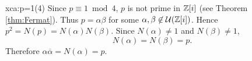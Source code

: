 %	
%	
%	

\begin{sol}{xca:p=1(4)}
    Since $p\equiv1\bmod4$, 
    $p$ is not prime in $\mathbb{Z}[i]$ (see Theorem \ref{thm:Fermat}). 
    Thus $p=\alpha\beta$ for some $\alpha,\beta\not\in\mathcal{U}(\mathbb{Z}[i])$. Hence $p^2=N(p)=N(\alpha)N(\beta)$. Since 
    $N(\alpha)\ne 1$ and $N(\beta)\ne 1$, 
    \[ 
    N(\alpha)=N(\beta)=p.
    \]
    Therefore $\alpha\overline{\alpha}=N(\alpha)=p$. 
\end{sol}

